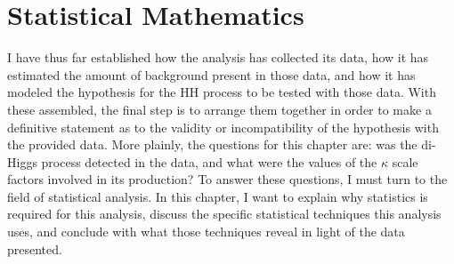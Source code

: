 %


\section{Statistical Mathematics}

    I have thus far established how the analysis has collected its data,
        how it has estimated the amount of background present in those data,
        and how it has modeled the hypothesis for the HH process to be tested with those data.
    With these assembled, the final step is to arrange them together in order to make a definitive statement
        as to the validity or incompatibility of the hypothesis with the provided data.
    More plainly, the questions for this chapter are:
        was the di-Higgs process detected in the data,
        and what were the values of the $\kappa$ scale factors involved in its production?
    To answer these questions, I must turn to the field of statistical analysis.
    In this chapter, I want to explain why statistics is required for this analysis,
        discuss the specific statistical techniques this analysis uses,
        and conclude with what those techniques reveal in light of the data presented.

